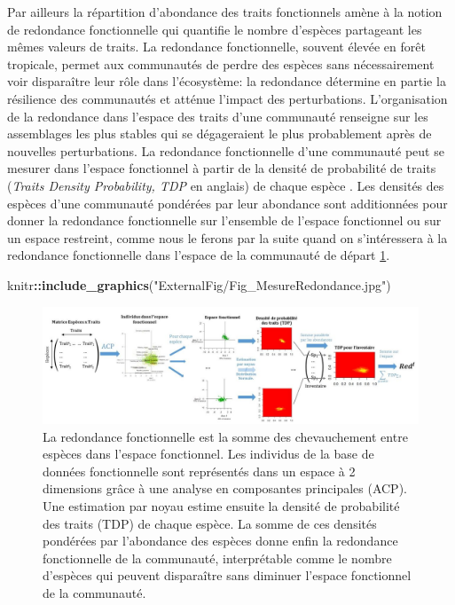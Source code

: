 \documentclass[
  11pt,
  french,
  A4paper,
  extrafontsizes,onecolumn,openright
  ]{memoir}
\newenvironment{Shaded}{\begin{snugshade}}{\end{snugshade}}
\newcommand{\KeywordTok}[1]{\textcolor[rgb]{0.13,0.29,0.53}{\textbf{#1}}}
\newcommand{\StringTok}[1]{\textcolor[rgb]{0.31,0.60,0.02}{#1}}
\newcommand{\OperatorTok}[1]{\textcolor[rgb]{0.81,0.36,0.00}{\textbf{#1}}}
\newcommand{\NormalTok}[1]{#1}
\begin{document}
Par ailleurs la répartition d'abondance des traits fonctionnels amène à
la notion de redondance fonctionnelle qui quantifie le nombre d'espèces
partageant les mêmes valeurs de traits. La redondance fonctionnelle,
souvent élevée en forêt tropicale, permet aux communautés de perdre des
espèces sans nécessairement voir disparaître leur rôle dans
l'écosystème: la redondance détermine en partie la résilience des
communautés et atténue l'impact des perturbations. L'organisation de la
redondance dans l'espace des traits d'une communauté renseigne sur les
assemblages les plus stables qui se dégageraient le plus probablement
après de nouvelles perturbations. La redondance fonctionnelle d'une
communauté peut se mesurer dans l'espace fonctionnel à partir de la
densité de probabilité de traits (\emph{Traits Density Probability, TDP}
en anglais) de chaque espèce \autocite{Carmona2016}. Les densités des
espèces d'une communauté pondérées par leur abondance sont additionnées
pour donner la redondance fonctionnelle sur l'ensemble de l'espace
fonctionnel ou sur un espace restreint, comme nous le ferons par la
suite quand on s'intéressera à la redondance fonctionnelle dans l'espace
de la communauté de départ \ref{fig:RedundancyMethod}.

\begin{Shaded}
\begin{Highlighting}[]
\NormalTok{knitr}\OperatorTok{::}\KeywordTok{include_graphics}\NormalTok{(}\StringTok{"ExternalFig/Fig_MesureRedondance.jpg"}\NormalTok{)}
\end{Highlighting}
\end{Shaded}

\begin{figure}

{\centering \includegraphics[width=0.8\linewidth]{ExternalFig/Fig_MesureRedondance} 

}

\caption{La redondance fonctionnelle est la somme des chevauchement entre espèces dans l'espace fonctionnel. Les individus de la base de données fonctionnelle sont représentés dans un espace à 2 dimensions grâce à une analyse en composantes principales (ACP). Une estimation par noyau estime ensuite la densité de probabilité des traits (TDP) de chaque espèce. La somme de ces densités pondérées par l'abondance des espèces donne enfin la redondance fonctionnelle de la communauté, interprétable comme le nombre d'espèces qui peuvent disparaître sans diminuer l'espace fonctionnel de la communauté.}\label{fig:RedundancyMethod}
\end{figure}
\end{document}
